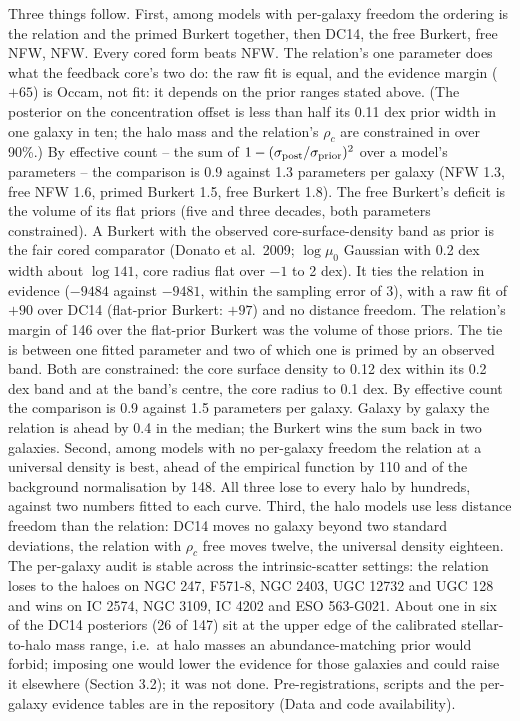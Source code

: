 \documentclass[
  10pt,
]{article}
\begin{document}
Three things follow. First, among models with per-galaxy freedom the ordering is the relation and the primed Burkert together, then DC14, the free Burkert, free NFW, NFW. Every cored form beats NFW. The relation's one parameter does what the feedback core's two do: the raw fit is equal, and the evidence margin ($+65$) is Occam, not fit: it depends on the prior ranges stated above. (The posterior on the concentration offset is less than half its 0.11 dex prior width in one galaxy in ten; the halo mass and the relation's $\rho_c$ are constrained in over 90\%.) By effective count -- the sum of $1-(\sigma_{\rm post}/\sigma_{\rm prior})^2$ over a model's parameters -- the comparison is 0.9 against 1.3 parameters per galaxy (NFW 1.3, free NFW 1.6, primed Burkert 1.5, free Burkert 1.8). The free Burkert's deficit is the volume of its flat priors (five and three decades, both parameters constrained). A Burkert with the observed core-surface-density band as prior is the fair cored comparator (Donato et al.~2009; $\log\mu_0$ Gaussian with 0.2 dex width about $\log 141$, core radius flat over $-1$ to 2 dex). It ties the relation in evidence ($-9484$ against $-9481$, within the sampling error of 3), with a raw fit of $+90$ over DC14 (flat-prior Burkert: $+97$) and no distance freedom. The relation's margin of 146 over the flat-prior Burkert was the volume of those priors. The tie is between one fitted parameter and two of which one is primed by an observed band. Both are constrained: the core surface density to 0.12 dex within its 0.2 dex band and at the band's centre, the core radius to 0.1 dex. By effective count the comparison is 0.9 against 1.5 parameters per galaxy. Galaxy by galaxy the relation is ahead by 0.4 in the median; the Burkert wins the sum back in two galaxies. Second, among models with no per-galaxy freedom the relation at a universal density is best, ahead of the empirical function by 110 and of the background normalisation by 148. All three lose to every halo by hundreds, against two numbers fitted to each curve. Third, the halo models use less distance freedom than the relation: DC14 moves no galaxy beyond two standard deviations, the relation with $\rho_c$ free moves twelve, the universal density eighteen. The per-galaxy audit is stable across the intrinsic-scatter settings: the relation loses to the haloes on NGC 247, F571-8, NGC 2403, UGC 12732 and UGC 128 and wins on IC 2574, NGC 3109, IC 4202 and ESO 563-G021. About one in six of the DC14 posteriors (26 of 147) sit at the upper edge of the calibrated stellar-to-halo mass range, i.e.\ at halo masses an abundance-matching prior would forbid; imposing one would lower the evidence for those galaxies and could raise it elsewhere (Section 3.2); it was not done. Pre-registrations, scripts and the per-galaxy evidence tables are in the repository (Data and code availability).
\end{document}
